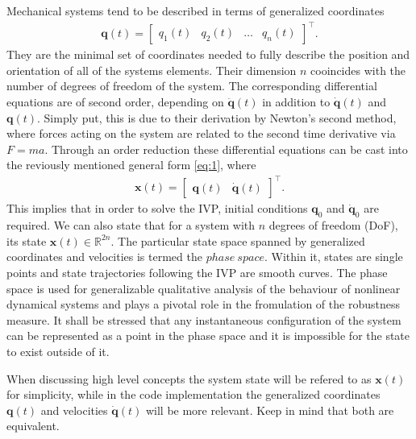     Mechanical systems tend to be described in terms of generalized coordinates \begin{gather}\mathbf{q}(t)=\begin{bmatrix}q_1(t)&q_2(t)&\ldots&q_n(t) \end{bmatrix}^\intercal . \end{gather} They are the minimal set of coordinates needed to fully describe the position and orientation of all of the systems elements. Their dimension $n$ cooincides with the number of degrees of freedom of the system. The corresponding differential equations are of second order, depending on $\ddot{\mathbf{q}}(t)$ in addition to $\dot{\mathbf{q}}(t)$ and $\mathbf{q}(t)$. Simply put, this is due to their derivation by Newton's second method, where forces acting on the system are related to the second time derivative via $F = ma$.
    Through an order reduction these differential equations can be cast into the reviously mentioned general form \ref{eq:1}, where \begin{gather*} \mathbf{x}(t) = \begin{bmatrix}\mathbf{q}(t)&\dot{\mathbf{q}}(t)\end{bmatrix}^\intercal .\end{gather*}
    This implies that in order to solve the IVP, initial conditions $\mathbf{q}_0$ and $\dot{\mathbf{q}}_0$ are required. We can also state that for a system with $n$ degrees of freedom (DoF), its state $\mathbf{x}(t) \in \mathbb{R}^{2n}$. The particular state space spanned by generalized coordinates and velocities is termed the $phase\ space$. Within it, states are single points and state trajectories following the IVP are smooth curves. The phase space is used for generalizable qualitative analysis of the behaviour of nonlinear dynamical systems and plays a pivotal role in the fromulation of the robustness measure. It shall be stressed that any instantaneous configuration of the system can be represented as a point in the phase space and it is impossible for the state to exist outside of it. 

    When discussing high level concepts the system state will be refered to as $\mathbf{x}(t)$ for simplicity, while in the code implementation the generalized coordinates $\mathbf{q}(t)$ and velocities $\dot{\mathbf{q}}(t)$ will be more relevant. Keep in mind that both are equivalent.









